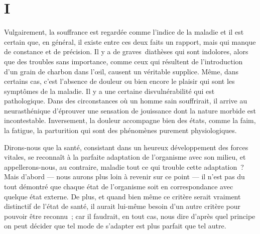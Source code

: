 \documentclass[french,twoside]{book} %
\begin{document}
\section[{I}]{I}
\noindent Vulgairement, la souffrance est regardée comme l’indice de la maladie et il est certain que, en général, il existe entre ces deux faits un rapport, mais qui manque de constance et de précision. Il y a de graves diathèses qui sont indolores, alors que des troubles sans importance, comme ceux qui résultent de l’introduction d’un grain de charbon dans l’œil, causent un véritable supplice. Même, dans certains cas, c’est l’absence de douleur ou bien encore le plaisir qui sont les symptômes de la maladie. Il y a une certaine disvulnérabilité qui est pathologique. Dans des circonstances où un homme sain souffrirait, il arrive au neurasthénique d’éprouver une sensation de jouissance dont la nature morbide est incontestable. Inversement, la douleur accompagne bien des états, comme la faim, la fatigue, la parturition qui sont des phénomènes purement physiologiques.\par
Dirons-nous que la santé, consistant dans un heureux développement des forces vitales, se reconnaît à la parfaite adaptation de l’organisme avec son milieu, et appellerons-nous, au contraire, maladie tout ce qui trouble cette adaptation ? Mais d’abord — nous aurons plus loin à revenir sur ce point — il n’est pas du tout démontré que chaque état de l’organisme soit en correspondance avec quelque état externe. De plus, et quand bien même ce critère serait vraiment distinctif de l’état de santé, il aurait lui-même besoin d’un autre critère pour pouvoir être reconnu ; car il faudrait, en tout cas, nous dire d’après quel principe on peut décider que tel mode de s’adapter est plus parfait que tel autre.\par
\end{document}
